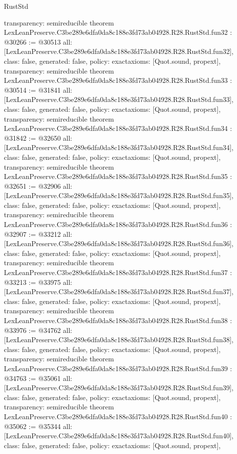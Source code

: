 \begin{lexlean}{RustStd}
\begin{coremodule}
{  transparency: semireducible
}
theorem LexLeanPreserve.C3be289e6dfa0da8c188e3fd73ab04928.R28.RustStd.fun32 : @30266 := @30513 {
  all: [LexLeanPreserve.C3be289e6dfa0da8c188e3fd73ab04928.R28.RustStd.fun32],
  class: false,
  generated: false,
  policy: exact{axioms: [Quot.sound, propext]},
  transparency: semireducible
}
theorem LexLeanPreserve.C3be289e6dfa0da8c188e3fd73ab04928.R28.RustStd.fun33 : @30514 := @31841 {
  all: [LexLeanPreserve.C3be289e6dfa0da8c188e3fd73ab04928.R28.RustStd.fun33],
  class: false,
  generated: false,
  policy: exact{axioms: [Quot.sound, propext]},
  transparency: semireducible
}
theorem LexLeanPreserve.C3be289e6dfa0da8c188e3fd73ab04928.R28.RustStd.fun34 : @31842 := @32650 {
  all: [LexLeanPreserve.C3be289e6dfa0da8c188e3fd73ab04928.R28.RustStd.fun34],
  class: false,
  generated: false,
  policy: exact{axioms: [Quot.sound, propext]},
  transparency: semireducible
}
theorem LexLeanPreserve.C3be289e6dfa0da8c188e3fd73ab04928.R28.RustStd.fun35 : @32651 := @32906 {
  all: [LexLeanPreserve.C3be289e6dfa0da8c188e3fd73ab04928.R28.RustStd.fun35],
  class: false,
  generated: false,
  policy: exact{axioms: [Quot.sound, propext]},
  transparency: semireducible
}
theorem LexLeanPreserve.C3be289e6dfa0da8c188e3fd73ab04928.R28.RustStd.fun36 : @32907 := @33212 {
  all: [LexLeanPreserve.C3be289e6dfa0da8c188e3fd73ab04928.R28.RustStd.fun36],
  class: false,
  generated: false,
  policy: exact{axioms: [Quot.sound, propext]},
  transparency: semireducible
}
theorem LexLeanPreserve.C3be289e6dfa0da8c188e3fd73ab04928.R28.RustStd.fun37 : @33213 := @33975 {
  all: [LexLeanPreserve.C3be289e6dfa0da8c188e3fd73ab04928.R28.RustStd.fun37],
  class: false,
  generated: false,
  policy: exact{axioms: [Quot.sound, propext]},
  transparency: semireducible
}
theorem LexLeanPreserve.C3be289e6dfa0da8c188e3fd73ab04928.R28.RustStd.fun38 : @33976 := @34762 {
  all: [LexLeanPreserve.C3be289e6dfa0da8c188e3fd73ab04928.R28.RustStd.fun38],
  class: false,
  generated: false,
  policy: exact{axioms: [Quot.sound, propext]},
  transparency: semireducible
}
theorem LexLeanPreserve.C3be289e6dfa0da8c188e3fd73ab04928.R28.RustStd.fun39 : @34763 := @35061 {
  all: [LexLeanPreserve.C3be289e6dfa0da8c188e3fd73ab04928.R28.RustStd.fun39],
  class: false,
  generated: false,
  policy: exact{axioms: [Quot.sound, propext]},
  transparency: semireducible
}
theorem LexLeanPreserve.C3be289e6dfa0da8c188e3fd73ab04928.R28.RustStd.fun40 : @35062 := @35344 {
  all: [LexLeanPreserve.C3be289e6dfa0da8c188e3fd73ab04928.R28.RustStd.fun40],
  class: false,
  generated: false,
  policy: exact{axioms: [Quot.sound, propext]},
}
\end{coremodule}
\end{lexlean}
